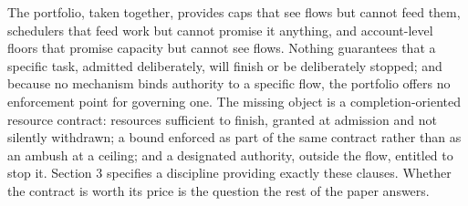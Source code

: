 The portfolio, taken together, provides caps that see flows but cannot
feed them, schedulers that feed work but cannot promise it anything, and
account-level floors that promise capacity but cannot see flows. Nothing
guarantees that a specific task, admitted deliberately, will finish or be
deliberately stopped; and because no mechanism binds authority to a
specific flow, the portfolio offers no enforcement point for governing
one. The missing object is a completion-oriented resource contract:
resources sufficient to finish, granted at admission and not silently
withdrawn; a bound enforced as part of the same contract rather than as
an ambush at a ceiling; and a designated authority, outside the flow,
entitled to stop it. Section 3 specifies a discipline providing exactly
these clauses. Whether the contract is worth its price is the question
the rest of the paper answers.
